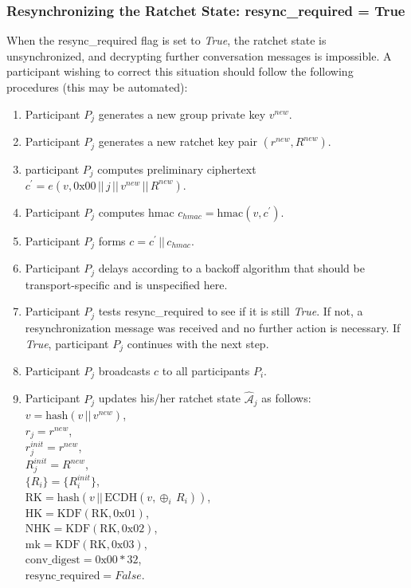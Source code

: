 \documentclass[%
preprint,
amsmath,amssymb,
aps,
prb,
floatfix,
]{revtex4-1}
\begin{document}
\subsubsection{\label{sec:sendresync}Resynchronizing the Ratchet State:
resync\_required = True}
When the resync\_required flag is set to \textit{True}, the ratchet state is
unsynchronized, and decrypting further conversation messages is impossible.
A participant wishing to correct this situation should follow the following
procedures (this may be automated):
\begin{enumerate}
\item Participant $P_j$ generates a new group private key $v^{new}$.
\item Participant $P_j$ generates a new ratchet key  pair $(r^{new}, R^{new})$.
\item participant $P_j$ computes preliminary ciphertext $c^\prime = e(v, 0\mathrm{x}00
\, || \, j \, || \, v^{new} \, || \, R^{new})$.
\item Participant $P_j$ computes hmac $c_{hmac} = \mathrm{hmac}(v, c^\prime)$.
\item Participant $P_j$ forms $c = c^\prime \, || \, c_{hmac}$.
\item Participant $P_j$ delays according to a backoff algorithm
that should be transport-specific and is unspecified here.
\item Participant $P_j$ tests resync\_required to see if it is still
\textit{True}. If not, a resynchronization message was received and no further
action is necessary. If \textit{True}, participant $P_j$ continues with the next
step.
\item Participant $P_j$ broadcasts $c$ to all participants $P_i$.
\item Participant $P_j$ updates his/her ratchet state
$\mathcal{\hat{A}}_j$ as follows:\\
$v = \mathrm{hash}(v \, || \, v^{new})$, \\
$r_j = r^{new}$, \\
$r_j^{init} = r^{new}$, \\
$R_j^{init} = R^{new}$, \\
$\{R_i\} = \{R_i^{init}\}$, \\
$\mathrm{RK} = \mathrm{hash}(v \, || \, \mathrm{ECDH}(v, \oplus_i
\, R_i))$, \\
$\mathrm{HK} = \mathrm{KDF}(\mathrm{RK}, 0\mathrm{x}01)$, \\
$\mathrm{NHK} = \mathrm{KDF}(\mathrm{RK}, 0\mathrm{x}02)$, \\
$\mathrm{mk} = \mathrm{KDF}(\mathrm{RK}, 0\mathrm{x}03)$, \\
$\mathrm{conv\_digest} = 0\mathrm{x}00 * 32$, \\
$\mathrm{resync\_required} = False$.
\end{enumerate}
\end{document}
